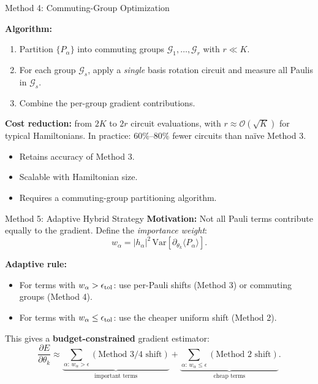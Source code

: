 \documentclass{beamer}
\begin{document}
\begin{frame}
\begin{frame}{Method 4: Commuting-Group Optimization}
\medskip

\textbf{Algorithm:}
\begin{enumerate}
\item Partition $\{P_\alpha\}$ into commuting groups
  $\mathcal{G}_1,\dots,\mathcal{G}_r$ with $r \ll K$.
\item For each group $\mathcal{G}_s$, apply a \emph{single} basis
  rotation circuit and measure all Paulis in $\mathcal{G}_s$.
\item Combine the per-group gradient contributions.
\end{enumerate}

\medskip

\textbf{Cost reduction:} from $2K$ to $2r$ circuit evaluations,
with $r \approx \mathcal{O}(\sqrt{K})$ for typical Hamiltonians.
In practice: $60\%$--$80\%$ fewer circuits than naïve Method 3.

\medskip

\begin{itemize}
\item[\textbf{+}] Retains accuracy of Method 3.
\item[\textbf{+}] Scalable with Hamiltonian size.
\item[\textbf{--}] Requires a commuting-group partitioning algorithm.
\end{itemize}
\end{frame}


\begin{frame}{Method 5: Adaptive Hybrid Strategy}
\textbf{Motivation:} Not all Pauli terms contribute equally to the
gradient. Define the \emph{importance weight}:
\[
w_\alpha = |h_\alpha|^2\,\mathrm{Var}[\partial_{\theta_k}\langle P_\alpha\rangle].
\]

\textbf{Adaptive rule:}
\begin{itemize}
\item For terms with $w_\alpha > \epsilon_{\rm tol}$: use per-Pauli
  shifts (Method 3) or commuting groups (Method 4).
\item For terms with $w_\alpha \le \epsilon_{\rm tol}$: use the cheaper
  uniform shift (Method 2).
\end{itemize}

This gives a \textbf{budget-constrained} gradient estimator:
\[
\frac{\partial E}{\partial\theta_k}
\approx
\underbrace{\sum_{\alpha:\,w_\alpha>\epsilon}
(\text{Method 3/4 shift})}_{\text{important terms}}
+
\underbrace{\sum_{\alpha:\,w_\alpha\le\epsilon}
(\text{Method 2 shift})}_{\text{cheap terms}}.
\]


\end{frame}
\end{frame}
\end{document}
